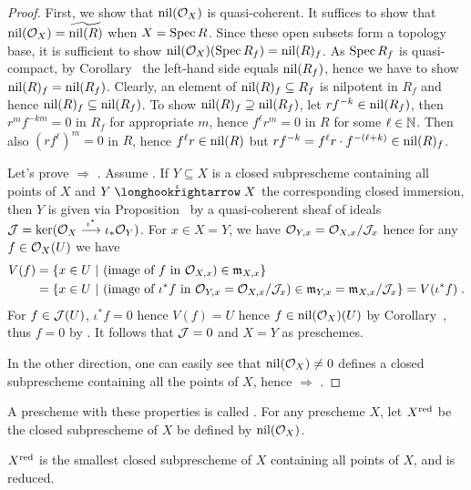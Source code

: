 \documentclass[a4paper,parskip=half,numbers=enddot, DIV=12]{scrreprt}
\begin{document}
\begin{proof}
    First, we show that $\operatorname{nil}(\mathcal{O}_X)$ is quasi-coherent. It suffices to show that $\nil(\Oo_X) = \snake{\nil(R)}$ when $X=\operatorname{Spec} R$. Since these open subsets form a topology base, it is sufficient to show $\operatorname{nil}(\mathcal{O}_X)(\operatorname{Spec} R_f) = \operatorname{nil}(R)_f$. As $\operatorname{Spec} R_f$ is quasi-compact, by Corollary~ the left-hand side equals $\operatorname{nil}(R_f)$, hence we have to show $\operatorname{nil}(R)_f = \operatorname{nil}(R_f)$. Clearly, an element of $\operatorname{nil}(R)_f\subseteq R_f$ is nilpotent in $R_f$ and hence $\operatorname{nil}(R)_f\subseteq\operatorname{nil}(R_f)$. To show $\operatorname{nil}(R)_f\supseteq\operatorname{nil}(R_f)$, let $rf^{-k}\in \operatorname{nil}(R_f)$, then $r^mf^{-km} = 0$ in $R_f$ for appropriate $m$, hence $f^\ell r^m = 0$ in $R$ for some $\ell\in\mathbb{N}$. Then also $(rf^\ell)^m = 0$ in $R$, hence $f^\ell r\in \operatorname{nil}(R)$ but $rf^{-k}=f^\ell r\cdot f^{-(\ell+k)}\in \operatorname{nil}(R)_f$.
    
    Let's prove  $\Rightarrow$ . Assume . If $Y\subseteq X$ is a closed subprescheme containing all points of $X$ and $Y\monomorphism[\iota]X$ the corresponding closed immersion, then $Y$ is given via Proposition~ by a quasi-coherent sheaf of ideals $\Jj=\ker(\Oo_X\morphism[\iota^*]\iota_*\Oo_Y)$. For $x\in X=Y$, we have $\mathcal{O}_{Y,x}= \mathcal{O}_{X,x}/\mathcal{J}_x$ hence for any $f\in \mathcal{O}_X(U)$ we have
    \begin{align*}
    	V(f) &= \left\{x\in U\ \middle|\  (\text{image of }f\text{ in }\mathcal{O}_{X,x})\in\mathfrak{m}_{X,x}\right\}\\
    	&= \left\{x\in U\ \middle|\  (\text{image of }\iota^*f\text{ in }\mathcal{O}_{Y,x}=\mathcal{O}_{X,x}/\mathcal{J}_x)\in\mathfrak{m}_{Y,x}=\mathfrak{m}_{X,x}/\mathcal{J}_x\right\}=V(\iota^*f)\;.
    \end{align*}
     For $f\in \mathcal{J}(U)$, $\iota^*f = 0$ hence $V(f) = U$ hence $f\in \operatorname{nil}(\mathcal{O}_X)(U)$ by Corollary~, thus $f=0$ by . It follows that $\mathcal{J}=0$ and $X=Y$ as preschemes.
    
    In the other direction, one can easily see that $\operatorname{nil}(\mathcal{O}_X) \neq 0$ defines a closed subprescheme containing all the points of $X$, hence  $\Rightarrow$ .
\end{proof}
\begin{defi} 
    A prescheme with these properties is called . For any prescheme $X$, let $X^{\mathrm{red}}$ be the closed subprescheme of $X$ be defined by $\operatorname{nil}(\mathcal{O}_X)$.
\end{defi}
\begin{rem}
    $X^{\mathrm{red}}$ is the smallest closed subprescheme of $X$ containing all points of $X$, and is reduced.
\end{rem}
\end{document}
